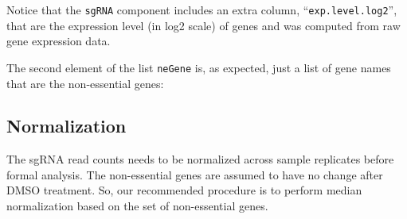 \documentclass[
]{article}
\newenvironment{Shaded}{\begin{snugshade}}{\end{snugshade}}
\newcommand{\CommentTok}[1]{\textcolor[rgb]{0.56,0.35,0.01}{\textit{#1}}}
\newcommand{\DecValTok}[1]{\textcolor[rgb]{0.00,0.00,0.81}{#1}}
\newcommand{\FunctionTok}[1]{\textcolor[rgb]{0.00,0.00,0.00}{#1}}
\newcommand{\NormalTok}[1]{#1}
\newcommand{\OtherTok}[1]{\textcolor[rgb]{0.56,0.35,0.01}{#1}}
\newcommand{\SpecialCharTok}[1]{\textcolor[rgb]{0.00,0.00,0.00}{#1}}
\begin{document}
Notice that the \texttt{sgRNA} component includes an extra column,
``\texttt{exp.level.log2}'', that are the expression level (in log2
scale) of genes and was computed from raw gene expression data.

The second element of the list \texttt{neGene} is, as expected, just a
list of gene names that are the non-essential genes:

\begin{Shaded}
\end{Shaded}

\hypertarget{normalization}{%
\subsection{Normalization}\label{normalization}}

The sgRNA read counts needs to be normalized across sample replicates
before formal analysis. The non-essential genes are assumed to have no
change after DMSO treatment. So, our recommended procedure is to perform
median normalization based on the set of non-essential genes.

\begin{Shaded}
\end{Shaded}
\end{document}
